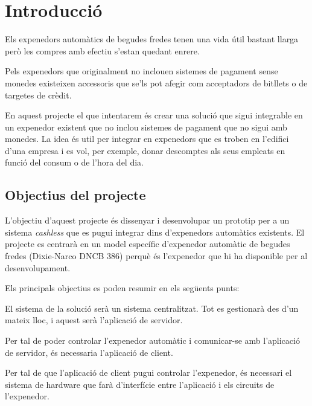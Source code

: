 \chapter{Introducció}

Els expenedors automàtics de begudes fredes tenen una vida útil bastant llarga però les compres amb efectiu s'estan quedant enrere.

Pels expenedors que originalment no inclouen sistemes de pagament sense monedes existeixen accessoris que se'ls pot afegir com acceptadors de bitllets o de targetes de crèdit.

En aquest projecte el que intentarem és crear una solució que sigui integrable en un expenedor existent que no inclou sistemes de pagament que no sigui amb monedes. La idea és util per integrar en expenedors que es troben en l'edifici d'una empresa i es vol, per exemple, donar descomptes als seus empleats en funció del consum o de l'hora del dia.

\section{Objectius del projecte}

L'objectiu d'aquest projecte és dissenyar i desenvolupar un prototip per a un sistema \textit{cashless} que es pugui integrar dins d'expenedors automàtics existents. El projecte es centrarà en un model específic d'expenedor automàtic de begudes fredes (Dixie-Narco DNCB 386) perquè és l'expenedor que hi ha disponible per al desenvolupament.

Els principals objectius es poden resumir en els següents punts:

\vspace{-0.5em}
\begin{description}[font=\normalfont\textsl]
\item [Dissenyar i desenvolupar l'aplicació de servidor. ] El sistema de la solució serà un sistema centralitzat. Tot es gestionarà des d'un mateix lloc, i aquest serà l'aplicació de servidor.
\item [Dissenyar i desenvolupar l'aplicació de client. ] Per tal de poder controlar l'expenedor automàtic i comunicar-se amb l'aplicació de servidor, és necessaria l'aplicació de client.
\item [Dissenyar  Desenvolupar el sistema de hardware. ] Per tal de que l'aplicació de client pugui controlar l'expenedor, és necessari el sistema de hardware que farà d'interfície entre l'aplicació i els circuits de l'expenedor.
\end{description}

